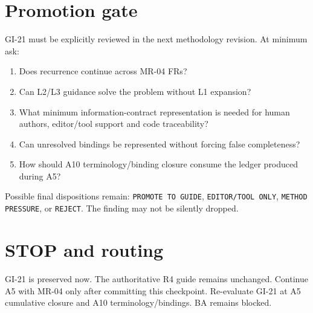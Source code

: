 \documentclass[11pt,a4paper]{article}
\begin{document}
\section{Promotion gate}
GI-21 must be explicitly reviewed in the next methodology revision. At minimum ask:
\begin{enumerate}
\item Does recurrence continue across MR-04 FRs?
\item Can L2/L3 guidance solve the problem without L1 expansion?
\item What minimum information-contract representation is needed for human authors, editor/tool support and code traceability?
\item Can unresolved bindings be represented without forcing false completeness?
\item How should A10 terminology/binding closure consume the ledger produced during A5?
\end{enumerate}

Possible final dispositions remain: \texttt{PROMOTE TO GUIDE}, \texttt{EDITOR/TOOL ONLY}, \texttt{METHOD PRESSURE}, or \texttt{REJECT}. The finding may not be silently dropped.

\section{STOP and routing}
\begin{ddtacore}[title={Checkpoint disposition}]
GI-21 is preserved now. The authoritative R4 guide remains unchanged. Continue A5 with MR-04 only after committing this checkpoint. Re-evaluate GI-21 at A5 cumulative closure and A10 terminology/bindings. BA remains blocked.
\end{ddtacore}
\end{document}

